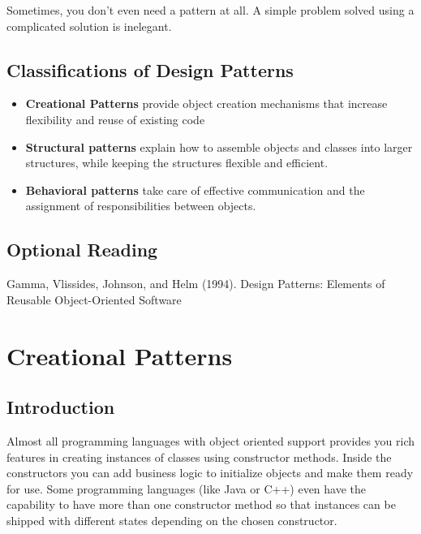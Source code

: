 Sometimes, you don't even need a pattern at all. A simple problem solved
using a complicated solution is inelegant.

\section{Classifications of Design
Patterns}\label{design-patterns-introduction.md__classifications-of-design-patterns}

\begin{itemize}
\tightlist
\item
  \textbf{Creational Patterns} provide object creation mechanisms that
  increase flexibility and reuse of existing code
\item
  \textbf{Structural patterns} explain how to assemble objects and
  classes into larger structures, while keeping the structures flexible
  and efficient.
\item
  \textbf{Behavioral patterns} take care of effective communication and
  the assignment of responsibilities between objects.
\end{itemize}

\section{Optional
Reading}\label{design-patterns-introduction.md__optional-reading}

Gamma, Vlissides, Johnson, and Helm (1994). Design Patterns: Elements of
Reusable Object-Oriented Software

\chapter{Creational
Patterns}\label{creational-patterns.md__creational-patterns}

\section{Introduction}\label{creational-patterns.md__introduction}

Almost all programming languages with object oriented support provides
you rich features in creating instances of classes using constructor
methods. Inside the constructors you can add business logic to
initialize objects and make them ready for use. Some programming
languages (like Java or C++) even have the capability to have more than
one constructor method so that instances can be shipped with different
states depending on the chosen constructor.

